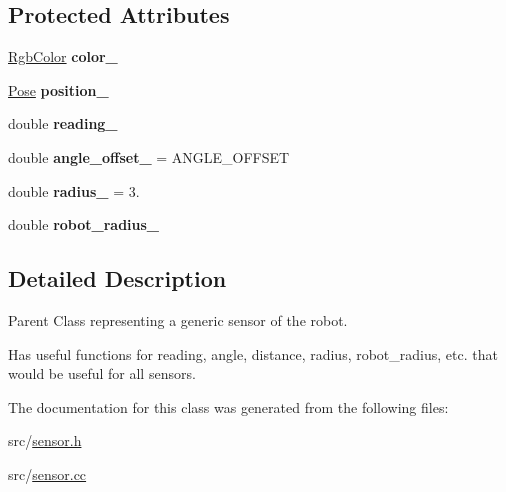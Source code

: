 \subsection*{Protected Attributes}
\begin{DoxyCompactItemize}
\item 
\hyperlink{structRgbColor}{Rgb\+Color} {\bfseries color\+\_\+}\hypertarget{classSensor_aab3091a119c15a76244603f7dfff7ac0}{}\label{classSensor_aab3091a119c15a76244603f7dfff7ac0}

\item 
\hyperlink{structPose}{Pose} {\bfseries position\+\_\+}\hypertarget{classSensor_a60e33927ebd8275de08836c083b28e01}{}\label{classSensor_a60e33927ebd8275de08836c083b28e01}

\item 
double {\bfseries reading\+\_\+}\hypertarget{classSensor_ad71b1c465eae9ddf1da31cff1cbe3736}{}\label{classSensor_ad71b1c465eae9ddf1da31cff1cbe3736}

\item 
double {\bfseries angle\+\_\+offset\+\_\+} = A\+N\+G\+L\+E\+\_\+\+O\+F\+F\+S\+ET\hypertarget{classSensor_af1ddfd0a34c7e7e7b426e40019147b49}{}\label{classSensor_af1ddfd0a34c7e7e7b426e40019147b49}

\item 
double {\bfseries radius\+\_\+} = 3.\hypertarget{classSensor_a1649a1783ee18d6e4ada55d8b5478f76}{}\label{classSensor_a1649a1783ee18d6e4ada55d8b5478f76}

\item 
double {\bfseries robot\+\_\+radius\+\_\+}\hypertarget{classSensor_a1c4575ca3e6ae73f7f024d81320d52c2}{}\label{classSensor_a1c4575ca3e6ae73f7f024d81320d52c2}

\end{DoxyCompactItemize}


\subsection{Detailed Description}
Parent Class representing a generic sensor of the robot. 

Has useful functions for reading, angle, distance, radius, robot\+\_\+radius, etc. that would be useful for all sensors. 

The documentation for this class was generated from the following files\+:\begin{DoxyCompactItemize}
\item 
src/\hyperlink{sensor_8h}{sensor.\+h}\item 
src/\hyperlink{sensor_8cc}{sensor.\+cc}\end{DoxyCompactItemize}
